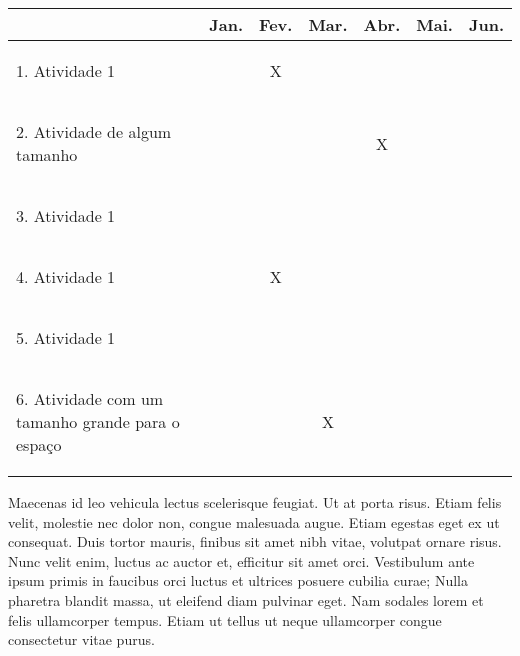 \label{sec:schedule}

\vspace{10pt}

\begin{center}
	\begin{tabular}{|m{5cm}|c|c|c|c|c|c|}
		\hline
		& Jan. & Fev. & Mar. & Abr. & Mai. & Jun. \\ \hline
		 \begin{flushleft} \vspace{-0.7em} 1. Atividade 1 \vspace{-1.1em} \end{flushleft} &  & X &  &  &  &  \\ \hline
		\begin{flushleft} \vspace{-0.7em} 2. Atividade de algum tamanho \vspace{-1.1em} \end{flushleft} &  &  &  & X &  &  \\ \hline
		\begin{flushleft} \vspace{-0.7em} 3. Atividade 1 \vspace{-1.1em} \end{flushleft} &  &  &  &  &  &  \\ \hline
		\begin{flushleft} \vspace{-0.7em} 4. Atividade 1 \vspace{-1.1em} \end{flushleft} &  & X &  &  &  &  \\ \hline
		\begin{flushleft} \vspace{-0.7em} 5. Atividade 1 \vspace{-1.1em} \end{flushleft} &  &  &  &  &  &  \\ \hline
		\begin{flushleft} \vspace{-0.7em} 6. Atividade com um tamanho grande para o espaço \vspace{-1.1em} \end{flushleft} &  &  & X &  &  &  \\ \hline
	\end{tabular}
\end{center}

\vspace{10pt}

Maecenas id leo vehicula lectus scelerisque feugiat. Ut at porta risus. Etiam felis velit, molestie nec dolor non, congue malesuada augue. Etiam egestas eget ex ut consequat. Duis tortor mauris, finibus sit amet nibh vitae, volutpat ornare risus. Nunc velit enim, luctus ac auctor et, efficitur sit amet orci. Vestibulum ante ipsum primis in faucibus orci luctus et ultrices posuere cubilia curae; Nulla pharetra blandit massa, ut eleifend diam pulvinar eget. Nam sodales lorem et felis ullamcorper tempus. Etiam ut tellus ut neque ullamcorper congue consectetur vitae purus.